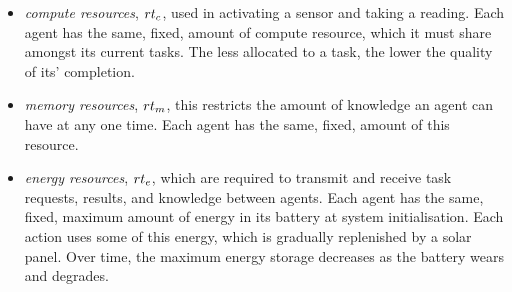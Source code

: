 \begin{itemize}
	\item \textit{compute resources}, $\varResourceTypeCompute{}{}$, used in activating a sensor and taking a reading. Each agent has the same, fixed, amount of compute resource, which it must share amongst its current tasks. The less allocated to a task, the lower the quality of its' completion. 
	\item \textit{memory resources}, $\varResourceTypeMemory{}{}$,  this restricts the amount of knowledge an agent can have at any one time. Each agent has the same, fixed, amount of this resource.
	\item \textit{energy resources}, $\varResourceTypeEnergy{}{}$,  which are required to transmit and receive task requests, results, and knowledge between agents. Each agent has the same, fixed, maximum amount of energy in its battery at system initialisation. Each action uses some of this energy, which is gradually replenished by a solar panel. Over time, the maximum energy storage decreases as the battery wears and degrades.
\end{itemize}

